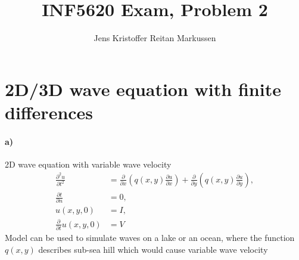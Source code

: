 \documentclass[11pt,a4paper]{article}
\author{Jens Kristoffer Reitan Markussen}
\title{INF5620 Exam, Problem 2}
\begin{document}
\maketitle

\section*{2D/3D wave equation with finite differences}
\paragraph*{a)}
2D wave equation with variable wave velocity
\begin{align}
\frac{\partial^2 u}{\partial t^2} &= \frac{\partial}{\partial x}\left(q(x,y)\frac{\partial u}{\partial x}\right) + \frac{\partial}{\partial y} \left(q(x,y)\frac{\partial u}{\partial y}\right), \\
\frac{\partial t}{\partial n} &= 0, \\
u(x,y,0) &= I, \\
\frac{\partial }{\partial t}u(x,y,0) &= V
\end{align}
Model can be used to simulate waves on a lake or an ocean, where the function $q(x,y)$ describes sub-sea hill which would cause variable wave velocity
\end{document}
